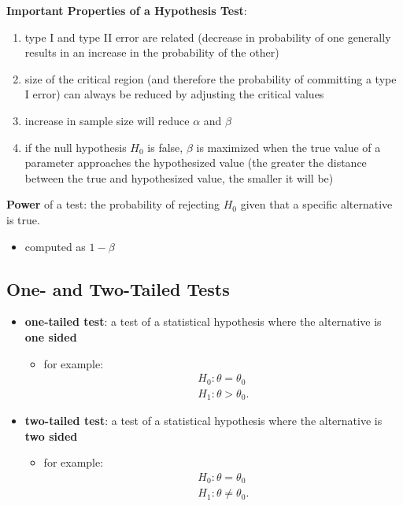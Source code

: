 \documentclass[10pt]{article}
\begin{document}
\begin{theorem}
    \textbf{Important Properties of a Hypothesis Test}:
    \begin{enumerate}
        \item type I and type II error are related (decrease in probability of one generally results in an increase in the probability of the other)
        \item size of the critical region (and therefore the probability of committing a type I error) can always be reduced by adjusting the critical values
        \item increase in sample size will reduce $\alpha$ and $\beta$ 
        \item if the null hypothesis $H_0$ is false, $\beta$ is maximized when the true value of a parameter approaches the hypothesized value (the greater the distance between the true and hypothesized value, the smaller it will be)
    \end{enumerate}
\end{theorem}
\begin{definition}
    \textbf{Power} of a test: the probability of rejecting $H_0$ given that a specific alternative is true.
    \begin{itemize}
        \item computed as $1-\beta$
    \end{itemize}
\end{definition}

\subsection{One- and Two-Tailed Tests}
\begin{itemize}
    \item \textbf{one-tailed test}: a test of a statistical hypothesis where the alternative is \textbf{one sided}
        \begin{itemize}
            \item for example:
                \begin{gather*}
                    H_0: \theta = \theta_0 \\ 
                    H_1: \theta > \theta_0
                .\end{gather*}
        \end{itemize}
    \item \textbf{two-tailed test}: a test of a statistical hypothesis where the alternative is \textbf{two sided}
        \begin{itemize}
            \item for example:
                \begin{gather*}
                    H_0: \theta = \theta_0 \\ 
                    H_1: \theta \neq \theta_0
                .\end{gather*}
        \end{itemize}
\end{itemize}
\end{document}
